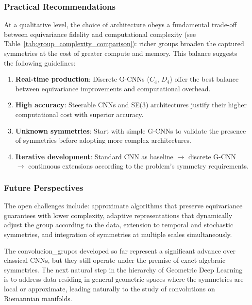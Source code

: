 \subsubsection{Practical Recommendations}\label{subsubsec:tradeoffs_recomendaciones}

At a qualitative level, the choice of architecture obeys a fundamental trade-off between equivariance fidelity and computational complexity (see Table~\ref{tab:group_complexity_comparison}): richer groups broaden the captured symmetries at the cost of greater compute and memory. This balance suggests the following guidelines:

\begin{enumerate}
    \item \textbf{Real-time production}: Discrete G-CNNs ($C_4$, $D_4$) offer the best balance between equivariance improvements and computational overhead.
    \item \textbf{High accuracy}: Steerable CNNs and SE(3) architectures justify their higher computational cost with superior accuracy.
    \item \textbf{Unknown symmetries}: Start with simple G-CNNs to validate the presence of symmetries before adopting more complex architectures.
    \item \textbf{Iterative development}: Standard CNN as baseline $\to$ discrete G-CNN $\to$ continuous extensions according to the problem's symmetry requirements.
\end{enumerate}

\subsubsection{Future Perspectives}\label{subsubsec:perspectivas_desarrollo_futuro}

The open challenges include: approximate algorithms that preserve equivariance guarantees with lower complexity, adaptive representations that dynamically adjust the group according to the data, extension to temporal and stochastic symmetries, and integration of symmetries at multiple scales simultaneously.

The \glspl{convolucion_grupo} developed so far represent a significant advance over classical CNNs, but they still operate under the premise of exact algebraic symmetries. The next natural step in the hierarchy of Geometric Deep Learning is to address data residing in general geometric spaces where the symmetries are local or approximate, leading naturally to the study of convolutions on Riemannian manifolds.
